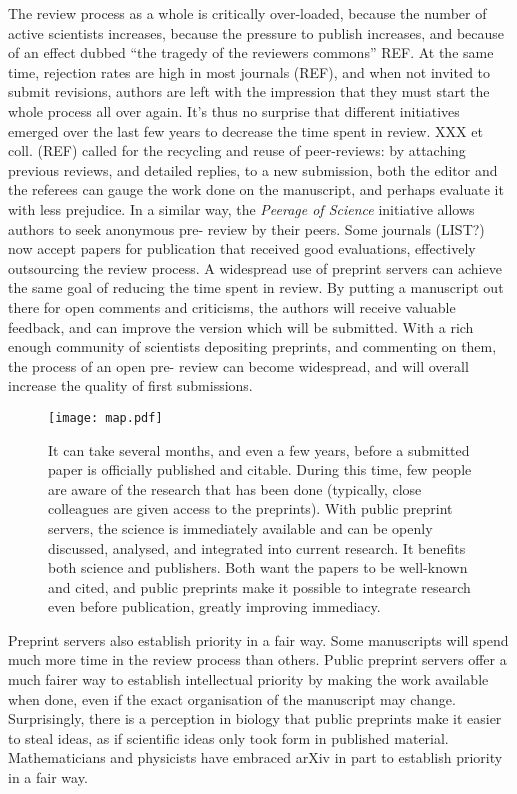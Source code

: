 \documentclass[letterpaper,twocolumn,superscriptaddress,showkeys]{revtex4}
\begin{document}
The review process as a whole is critically over-loaded, because the
number of active scientists increases, because the pressure to publish
increases, and because of an effect dubbed ``the tragedy of the
reviewers commons'' REF.  At the same time, rejection rates are high
in most journals (REF), and when not invited to submit revisions,
authors are left with the impression that they must start the whole
process all over again. It's thus no surprise that different
initiatives emerged over the last few years to decrease the time spent
in review. XXX et coll. (REF) called for the recycling and reuse of
peer-reviews: by attaching previous reviews, and detailed replies, to
a new submission, both the editor and the referees can gauge the work
done on the manuscript, and perhaps evaluate it with less
prejudice. In a similar way, the \emph{Peerage of Science} initiative
allows authors to seek anonymous pre- review by their peers. Some
journals (LIST?) now accept papers for publication that received good
evaluations, effectively outsourcing the review process. A widespread
use of preprint servers can achieve the same goal of reducing the time
spent in review. By putting a manuscript out there for open comments
and criticisms, the authors will receive valuable feedback, and can
improve the version which will be submitted. With a rich enough
community of scientists depositing preprints, and commenting on them,
the process of an open pre- review can become widespread, and will
overall increase the quality of first submissions.

\begin{figure}[ht!] \centering\texttt{[image: map.pdf]}
\caption { It can take several months, and even a few years, before a submitted
paper is officially published and citable. During this time, few people are
aware of the research that has been done (typically, close colleagues are
given access to the preprints). With public preprint servers, the science is
immediately available and can be openly discussed, analysed, and integrated
into current research. It benefits both science and publishers. Both want the
papers to be well-known and cited, and public preprints make it possible to
integrate research even before publication, greatly improving immediacy.  }
\label{fig:map}
\end{figure}

Preprint servers also establish priority in a fair way.  Some
manuscripts will spend much more time in the review process than
others.  Public preprint servers offer a much fairer way to establish
intellectual priority by making the work available when done, even if
the exact organisation of the manuscript may change. Surprisingly,
there is a perception in biology that public preprints make it easier
to steal ideas, as if scientific ideas only took form in published
material.
Mathematicians and physicists have embraced arXiv in part to establish
priority in a fair way\cite{cal12}.
\end{document}
